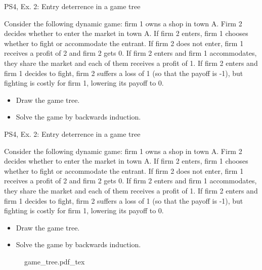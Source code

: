 \begin{frame}{PS4, Ex. 2: Entry deterrence in a game tree}
  \begin{multicols}{2}
    Consider the following dynamic game: firm 1 owns a shop in town A. Firm 2 decides whether to enter the market in town A. If firm 2 enters, firm 1 chooses whether to fight or accommodate the entrant. If firm 2 does not enter, firm 1 receives a profit of 2 and firm 2 gets 0. If firm 2 enters and firm 1 accommodates, they share the market and each of them receives a profit of 1. If firm 2 enters and firm 1 decides to fight, firm 2 suffers a loss of 1 (so that the payoff is -1), but fighting is costly for firm 1, lowering its payoff to 0.
    \begin{itemize}
      \item[(a)] Draw the game tree.
      \item[(b)] Solve the game by backwards induction.
    \end{itemize}
  \vfill\null \columnbreak
  \vfill\null
  \end{multicols}
\end{frame}
\begin{frame}{PS4, Ex. 2: Entry deterrence in a game tree}
  \begin{multicols}{2}
    Consider the following dynamic game: firm 1 owns a shop in town A. Firm 2 decides whether to enter the market in town A. If firm 2 enters, firm 1 chooses whether to fight or accommodate the entrant. If firm 2 does not enter, firm 1 receives a profit of 2 and firm 2 gets 0. If firm 2 enters and firm 1 accommodates, they share the market and each of them receives a profit of 1. If firm 2 enters and firm 1 decides to fight, firm 2 suffers a loss of 1 (so that the payoff is -1), but fighting is costly for firm 1, lowering its payoff to 0.
    \begin{itemize}
      \item[(a)] Draw the game tree.
      \item[(b)] Solve the game by backwards induction.
    \end{itemize}
  \vfill\null \columnbreak
    \begin{figure}[!h]
      \begin{center}
      \def\svgwidth{1.0\columnwidth}
      {game_tree.pdf_tex}
      \end{center}
    \end{figure}
  \vfill\null
  \end{multicols}
\end{frame}
